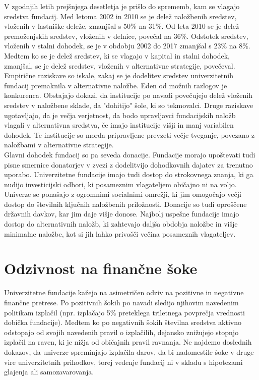\documentclass[12pt, a4paper]{article}
\begin{document}
V zgodnjih letih prejšnjega desetletja je prišlo do sprememb, kam se vlagajo sredstva fundacij. Med letoma 2002 in 2010 se je delež naložbenih sredstev, vloženih v lastniške deleže, zmanjšal s 50\% na 31\%. Od leta 2010 se je delež premoženjskih sredstev, vloženih v delnice, povečal na 36\%. Odstotek sredstev, vloženih v stalni dohodek, se je v obdobju 2002 do 2017 zmanjšal s 23\% na 8\%. Medtem ko se je delež sredstev, ki se vlagajo v kapital in stalni dohodek, zmanjšal, se je delež sredstev, vloženih v alternativne strategije, povečeval. Empirične raziskave so iskale, zakaj se je dodelitev sredstev univerzitetnih fundacij premaknila v alternativne naložbe. Eden od možnih razlogov je konkurenca. Obstajajo dokazi, da institucije po navadi povečujejo delež vloženih sredstev v naložbene sklade, da "dohitijo" šole, ki so tekmovalci. Druge raziskave ugotavljajo, da je večja verjetnost, da bodo upravljavci fundacijskih naložb vlagali v alternativna sredstva, če imajo institucije višji in manj variabilen dohodek. Te institucije so morda pripravljene prevzeti večje tveganje, povezano z naložbami v alternativne strategije.\cite{investment2}\\

Glavni dohodek fundacij so pa seveda donacije. Fundacije morajo upoštevati tudi pisne smernice donatorjev v zvezi z dodelitvijo dohodkovnih dajatev za trenutno uporabo. Univerzitetne fundacije imajo tudi dostop do strokovnega znanja, ki ga nudijo investicijski odbori, ki posameznim vlagateljem običajno ni na voljo. Univerze se ponašajo z ogromnimi socialnimi omrežji, ki jim omogočajo večji dostop do številnih ključnih naložbenih priložnosti.
Donacije so tudi oproščene državnih davkov, kar jim daje višje donose. Najbolj uspešne fundacije imajo dostop do alternativnih naložb, ki zahtevajo daljša obdobja naložbe in višje minimalne naložbe, kot si jih lahko privošči večina posameznih vlagateljev. \cite{Investopedia2}

\section[Odzivnost na finančne šoke]{Odzivnost na finančne šoke}

Univerzitetne fundacije kažejo na asimetričen odziv na pozitivne in negativne finančne pretrese. Po pozitivnih šokih po navadi sledijo njihovim navedenim politikam izplačil (npr. izplačajo 5\% preteklega triletnega povprečja vrednosti dobička fundacije). Medtem ko po negativnih šokih številna sredstva aktivno odstopajo od svojih navedenih pravil o izplačilih, dejansko znižujejo stopnjo izplačil na raven, ki je nižja od običajnih pravil ravnanja. Ne najdemo doslednih dokazov, da univerze spreminjajo izplačila darov, da bi nadomestile šoke v druge vire univerzitetnih prihodkov, torej vedenje fundacij ni v skladu s hipotezami glajenja ali samozavarovanja.\\
\end{document}

